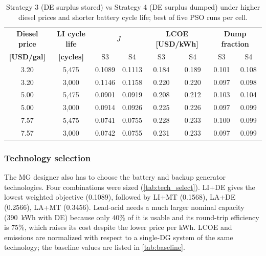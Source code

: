 \documentclass[final,3p,times]{elsarticle}
\begin{document}
\begin{table}[htbp]
\centering
\small
\begin{tabular}{c c c c c c c c}
\toprule
\textbf{Diesel price} & \textbf{LI cycle life} & \multicolumn{2}{c}{\textbf{$J$}} & \multicolumn{2}{c}{\textbf{LCOE [USD/kWh]}} & \multicolumn{2}{c}{\textbf{Dump fraction}} \\
\textbf{[USD/gal]} & \textbf{[cycles]} & S3 & S4 & S3 & S4 & S3 & S4 \\
\midrule
3.20 & 5,475 & 0.1089 & 0.1113 & 0.184 & 0.189 & 0.101 & 0.108 \\
3.20 & 3,000 & 0.1146 & 0.1158 & 0.220 & 0.220 & 0.097 & 0.098 \\
5.00 & 5,475 & 0.0901 & 0.0919 & 0.208 & 0.212 & 0.103 & 0.104 \\
5.00 & 3,000 & 0.0914 & 0.0926 & 0.225 & 0.226 & 0.097 & 0.099 \\
7.57 & 5,475 & 0.0741 & 0.0755 & 0.228 & 0.233 & 0.100 & 0.099 \\
7.57 & 3,000 & 0.0742 & 0.0755 & 0.231 & 0.233 & 0.097 & 0.099 \\
\bottomrule
\end{tabular}
\caption{\label{tab:strategy_stress} Strategy 3 (DE surplus stored) vs Strategy 4 (DE surplus dumped) under higher diesel prices and shorter battery cycle life; best of five PSO runs per cell.}
\end{table}

\subsubsection{Technology selection\label{sec:tech_select}}
The MG designer also has to choose the battery and backup generator technologies. Four combinations were sized (\cref{tab:tech_select}). LI+DE gives the lowest weighted objective (0.1089), followed by LI+MT (0.1568), LA+DE (0.2566), LA+MT (0.3456). Lead-acid needs a much larger nominal capacity (390~kWh with DE) because only 40\% of it is usable and its round-trip efficiency is 75\%, which raises its cost despite the lower price per kWh. LCOE and emissions are normalized with respect to a single-DG system of the same technology; the baseline values are listed in \cref{tab:baseline}.
\end{document}
